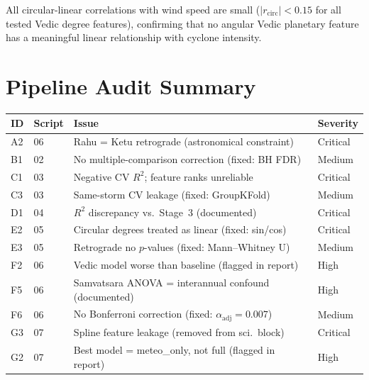 \documentclass[12pt,a4paper]{article}
\begin{document}
All circular-linear correlations with wind speed are small ($|r_{\text{circ}}| < 0.15$
for all tested Vedic degree features), confirming that no angular Vedic planetary
feature has a meaningful linear relationship with cyclone intensity.

\section{Pipeline Audit Summary}
\label{app:audit}

\begin{center}
\begin{tabular}{llll}
\toprule
\textbf{ID} & \textbf{Script} & \textbf{Issue} & \textbf{Severity} \\
\midrule
A2 & 06 & Rahu = Ketu retrograde (astronomical constraint) & Critical \\
B1 & 02 & No multiple-comparison correction (fixed: BH FDR) & Medium \\
C1 & 03 & Negative CV $R^2$; feature ranks unreliable & Critical \\
C3 & 03 & Same-storm CV leakage (fixed: GroupKFold) & Medium \\
D1 & 04 & $R^2$ discrepancy vs.\ Stage~3 (documented) & Critical \\
E2 & 05 & Circular degrees treated as linear (fixed: sin/cos) & Critical \\
E3 & 05 & Retrograde no $p$-values (fixed: Mann--Whitney U) & Medium \\
F2 & 06 & Vedic model worse than baseline (flagged in report) & High \\
F5 & 06 & Samvatsara ANOVA = interannual confound (documented) & High \\
F6 & 06 & No Bonferroni correction (fixed: $\alpha_{\text{adj}} = 0.007$) & Medium \\
G3 & 07 & Spline feature leakage (removed from sci.\ block) & Critical \\
G2 & 07 & Best model = meteo\_only, not full (flagged in report) & High \\
\bottomrule
\end{tabular}
\end{center}
\end{document}
